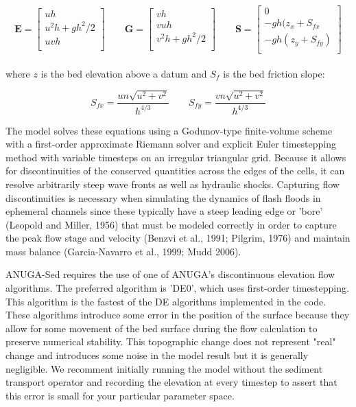 \documentclass[11pt]{article}
\begin{document}
\begin{equation}
 \mathbf{E} = \begin{bmatrix}
       uh\\[0.5em]
       u^2h+gh^2/2\\[0.5em]
       uvh\\
     \end{bmatrix}
     \qquad
      \mathbf{G} = \begin{bmatrix}
       vh\\[0.5em]
       vuh\\[0.5em]
       v^2h+gh^2/2\\
     \end{bmatrix}
 \qquad
      \mathbf{S} = \begin{bmatrix}
       0\\[0.5em]
       -gh(z_x + S_{fx}\\[0.5em]
       -gh(z_y + S_{fy})\\
     \end{bmatrix}
\end{equation}
\ \\
\noindent where $z$ is the bed elevation above a datum and $S_f$ is the bed friction slope:

\begin{equation}
S_{fx} = \frac{un\sqrt{u^2 + v^2}}{h^{4/3}}
 \qquad
 S_{fy} = \frac{vn\sqrt{u^2 + v^2}}{h^{4/3}}
\end{equation}

The model solves these equations using a Godunov-type finite-volume scheme with a first-order approximate Riemann solver \citep{toro1992riemann} and explicit Euler timestepping method with variable timesteps on an irregular triangular grid. Because it allows for discontinuities of the conserved quantities across the edges of the cells, it can resolve arbitrarily steep wave fronts as well as hydraulic shocks. Capturing flow discontinuities is necessary when simulating the dynamics of flash floods in ephemeral channels since these typically have a steep leading edge or 'bore' (Leopold and Miller, 1956) that must be modeled correctly in order to capture the peak flow stage and velocity (Benzvi et al., 1991; Pilgrim, 1976) and maintain mass balance (Garcia-Navarro et al., 1999; Mudd 2006).

ANUGA-Sed requires the use of one of ANUGA's discontinuous elevation flow algorithms. The preferred algorithm is 'DE0', which uses first-order timestepping. This algorithm is the fastest of the DE algorithms implemented in the code. These algorithms introduce some error in the position of the surface because they allow for some movement of the bed surface during the flow calculation to preserve numerical stability. This topographic change does not represent "real" change and introduces some noise in the model result but it is generally negligible. We recomment initially running the model without the sediment transport operator and recording the elevation at every timestep to assert that this error is small for your particular parameter space.
\end{document}
